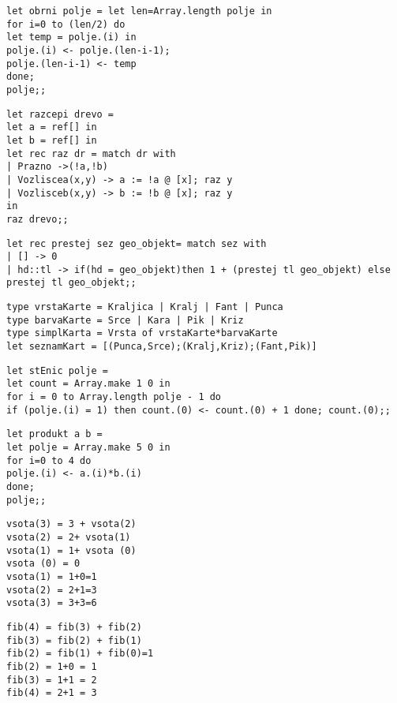 \begin{Odgovor}{2.56}
\begin{lstlisting}
let obrni polje = let len=Array.length polje in
for i=0 to (len/2) do
let temp = polje.(i) in
polje.(i) <- polje.(len-i-1);
polje.(len-i-1) <- temp
done;
polje;;
\end{lstlisting}
\end{Odgovor}
\begin{Odgovor}{2.58}
\begin{lstlisting}
let razcepi drevo =
let a = ref[] in
let b = ref[] in
let rec raz dr = match dr with
| Prazno ->(!a,!b)
| Vozliscea(x,y) -> a := !a @ [x]; raz y
| Vozlisceb(x,y) -> b := !b @ [x]; raz y
in
raz drevo;;
\end{lstlisting}
\end{Odgovor}
\begin{Odgovor}{2.71}
\begin{lstlisting}
let rec prestej sez geo_objekt= match sez with
| [] -> 0
| hd::tl -> if(hd = geo_objekt)then 1 + (prestej tl geo_objekt) else prestej tl geo_objekt;;
\end{lstlisting}
\end{Odgovor}
\begin{Odgovor}{2.75}
\begin{lstlisting}
type vrstaKarte = Kraljica | Kralj | Fant | Punca
type barvaKarte = Srce | Kara | Pik | Kriz
type simplKarta = Vrsta of vrstaKarte*barvaKarte
let seznamKart = [(Punca,Srce);(Kralj,Kriz);(Fant,Pik)]
\end{lstlisting}
\end{Odgovor}
\begin{Odgovor}{3.5}
\begin{lstlisting}
let stEnic polje =
let count = Array.make 1 0 in
for i = 0 to Array.length polje - 1 do
if (polje.(i) = 1) then count.(0) <- count.(0) + 1 done; count.(0);;
\end{lstlisting}
\end{Odgovor}
\begin{Odgovor}{3.6}
\begin{lstlisting}
let produkt a b =
let polje = Array.make 5 0 in
for i=0 to 4 do
polje.(i) <- a.(i)*b.(i)
done;
polje;;
\end{lstlisting}
\end{Odgovor}
\begin{Odgovor}{3.29}
\begin{lstlisting}
vsota(3) = 3 + vsota(2)
vsota(2) = 2+ vsota(1)
vsota(1) = 1+ vsota (0)
vsota (0) = 0
vsota(1) = 1+0=1
vsota(2) = 2+1=3
vsota(3) = 3+3=6
\end{lstlisting}
\end{Odgovor}
\begin{Odgovor}{3.30}
\begin{lstlisting}
fib(4) = fib(3) + fib(2)
fib(3) = fib(2) + fib(1)
fib(2) = fib(1) + fib(0)=1
fib(2) = 1+0 = 1
fib(3) = 1+1 = 2
fib(4) = 2+1 = 3
\end{lstlisting}
\end{Odgovor}
